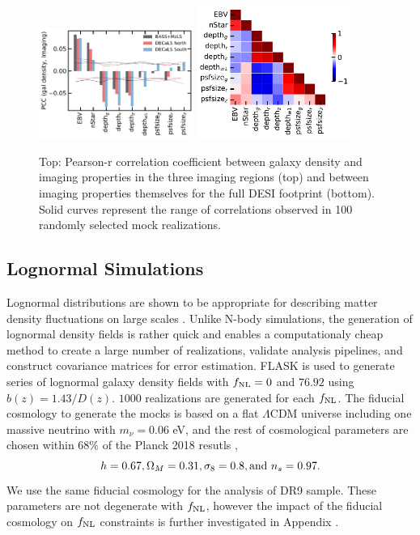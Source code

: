 \begin{figure}
    \includegraphics[width=0.45\textwidth]{figures/pcc.pdf} 
    \includegraphics[width=0.45\textwidth]{figures/pccx.pdf}     
    \caption{Top: Pearson-r correlation coefficient between galaxy density and imaging properties in the three imaging regions (top) and between imaging properties themselves for the full DESI footprint (bottom). Solid curves represent the range of correlations observed in 100 randomly selected mock realizations.}
    \label{fig:pcc}
\end{figure}


\subsection{Lognormal Simulations}
Lognormal distributions are shown to be appropriate for describing matter density fluctuations on large scales \citep{coles1991}. Unlike N-body simulations, the generation of lognormal density fields is rather quick and enables a computationaly cheap method to create a large number of realizations, validate analysis pipelines, and construct covariance matrices for error estimation. \textsc{FLASK}  \citep[Full-sky Lognormal Astro-fields Simulation Kit;][]{Xavier_2016} is used to generate series of lognormal galaxy density fields with $f_{\rm NL}=0$ and $76.92$ using $b(z)=1.43/D(z)$. $1000$ realizations are generated for each $f_{\rm NL}$. The fiducial cosmology to generate the mocks is based on a flat $\Lambda$CDM universe including one massive neutrino with $m_{\nu}=0.06$ eV, and the rest of cosmological parameters are chosen within $68\%$ of the Planck 2018 resutls ,
\begin{equation*}
    h = 0.67,  \Omega_{M}=0.31, \sigma_{8}=0.8, {\rm and}~ n_{s}=0.97.
\end{equation*}
We use the same fiducial cosmology for the analysis of DR9 sample. These parameters are not degenerate with $f_{\rm NL}$, however the impact of the fiducial cosmology on $f_{\rm NL}$ constraints is further investigated in Appendix .